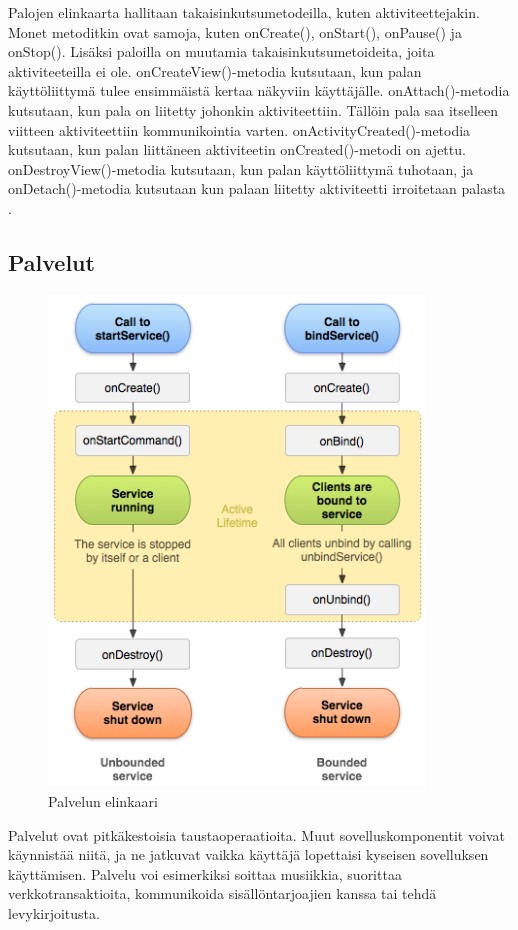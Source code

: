 Palojen elinkaarta hallitaan takaisinkutsumetodeilla, kuten aktiviteettejakin. Monet metoditkin ovat samoja, kuten onCreate(), onStart(), onPause() ja onStop(). Lisäksi paloilla on muutamia takaisinkutsumetoideita, joita aktiviteeteilla ei ole. onCreateView()-metodia kutsutaan, kun palan käyttöliittymä tulee ensimmäistä kertaa näkyviin käyttäjälle. onAttach()-metodia kutsutaan, kun pala on liitetty johonkin aktiviteettiin. Tällöin pala saa itselleen viitteen aktiviteettiin kommunikointia varten. onActivityCreated()-metodia kutsutaan, kun palan liittäneen aktiviteetin onCreated()-metodi on ajettu. onDestroyView()-metodia kutsutaan, kun palan käyttöliittymä tuhotaan, ja onDetach()-metodia kutsutaan kun palaan liitetty aktiviteetti irroitetaan palasta \cite{android}.

\subsection{Palvelut}

\begin{figure}[htb]
\includegraphics[width=100mm]{service_lifecycle.png}
\caption{Palvelun elinkaari} \label{service_lifecycle}
\end{figure}

Palvelut ovat pitkäkestoisia taustaoperaatioita. Muut sovelluskomponentit voivat käynnistää niitä, ja ne jatkuvat vaikka käyttäjä lopettaisi kyseisen sovelluksen käyttämisen. Palvelu voi esimerkiksi soittaa musiikkia, suorittaa verkkotransaktioita, kommunikoida sisällöntarjoajien kanssa tai tehdä levykirjoitusta.

